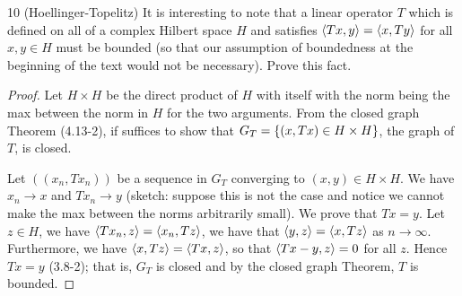 \begin{exercise}{10 (Hoellinger-Topelitz)}
It is interesting to note that a linear operator $T$ which is defined on all of a complex Hilbert space $H$ and satisfies $\langle Tx, y\rangle = \langle x, Ty\rangle$ for all $x, y \in H$ must be bounded (so that our assumption of boundedness at the beginning of the text would not be necessary).
Prove this fact.
\end{exercise}
\begin{proof}
Let $H \times H$ be the direct product of $H$ with itself with the norm being the max between the norm in $H$ for the two arguments.
From the closed graph Theorem (4.13-2), if suffices to show that $G_T = \{(x, Tx) \in H \times H\}$, the graph of $T$, is closed.

Let $((x_n, T x_n))$ be a sequence in $G_T$ converging to $(x, y) \in H \times H$.
We have $x_n \to x$ and $Tx_n \to y$ (sketch: suppose this is not the case and notice we cannot make the max between the norms arbitrarily small).
We prove that $Tx = y$.
Let $z \in H$, we have $\langle Tx_n, z\rangle = \langle x_n, Tz\rangle$, we have that $\langle y, z\rangle = \langle x, Tz\rangle$ as $n \to \infty$.
Furthermore, we have $\langle x, Tz\rangle = \langle Tx, z\rangle$, so that $\langle Tx - y, z\rangle = 0$ for all $z$.
Hence $Tx = y$ (3.8-2);
that is, $G_T$ is closed and by the closed graph Theorem, $T$ is bounded.
\end{proof} 

